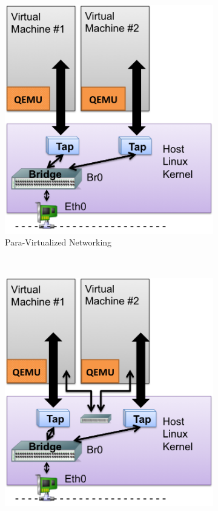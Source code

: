 \begin{enumerate}
\begin{figure}
\begin{subfigure}[b]{0.35\textwidth}
                \includegraphics[width=\textwidth]{kvm-para.png}
                \caption{Para-Virtualized Networking}
                \label{fig:kvm-para}
        \end{subfigure}
        ~ %
\newline \newline
        \begin{subfigure}[b]{0.35\textwidth}
                \includegraphics[width=\textwidth]{kvm-internal.png}

\end{subfigure}
\end{figure}
\end{enumerate}
